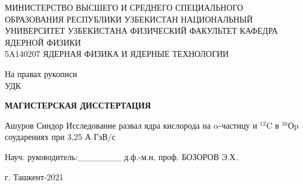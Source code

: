 \documentclass[fontsize=14pt]{scrarticle}
\begin{document}
	\begin{titlepage}
		\begin{center}
			\vspace{0.25cm}
        \large 	МИНИСТЕРСТВО ВЫСШЕГО И СРЕДНЕГО СПЕЦИАЛЬНОГО ОБРАЗОВАНИЯ РЕСПУБЛИКИ УЗБЕКИСТАН НАЦИОНАЛЬНЫЙ  УНИВЕРСИТЕТ УЗБЕКИСТАНА ФИЗИЧЕСКИЙ ФАКУЛЬТЕТ КАФЕДРА ЯДЕРНОЙ ФИЗИКИ\\  5A140207 ЯДЕРНАЯ ФИЗИКА И ЯДЕРНЫЕ ТЕХНОЛОГИИ	
			
			\begin{flushright}
			\small{На правах рукописи}\\
           \small{ УДК \ \ \ \ \ \ \ \ \ \ \ }
			\end{flushright}
			\vfill
			
			\large \textbf{МАГИСТЕРСКАЯ ДИССТЕРТАЦИЯ }
			
			Ашуров Синдор
			\vfill
			{\large Исследование развал ядра кислорода на $\alpha$-частицу и $^{12}$C в $^{16}$Оp соударениях при 3,25 А ГэВ/с\\
			}
			\bigskip
		\end{center}

         
         \vfill
         
         \begin{flushleft}

Науч. руководитель:\_\_\_\_\_\_\_ д.ф.-м.н, проф. БОЗОРОВ Э.Х.
         \end{flushleft}
		\vfill
		
		\vfill
		\begin{center}
			г. Ташкент-2021
		\end{center}
	\end{titlepage}
	\newpage
	\makenomenclature 
	\renewcommand{\nomname}{Перечень условных обозначений}
    \newcommand*{\nom}[2]{#1\nomenclature{#1}{#2}}
	\printnomenclature[5em]
	\newpage
	\renewcommand{\contentsname}{Содержание}
	\tableofcontents
	\newpage
	
\end{document}
